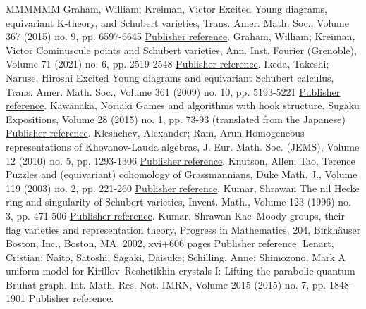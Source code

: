 \begin{thebibliography}{MMMMMM}
 Graham, William; Kreiman, Victor Excited Young diagrams, equivariant K-theory, and Schubert varieties, Trans. Amer. Math. Soc., Volume 367 (2015) no. 9, pp. 6597-6645 \href{https://alco.centre-mersenne.org/articles/10.5802/alco.428/#graham.kreiman:excited}{Publisher reference}.
 Graham, William; Kreiman, Victor Cominuscule points and Schubert varieties, Ann. Inst. Fourier (Grenoble), Volume 71 (2021) no. 6, pp. 2519-2548 \href{https://alco.centre-mersenne.org/articles/10.5802/alco.428/#graham.kreiman:cominuscule_pt}{Publisher reference}.
 Ikeda, Takeshi; Naruse, Hiroshi Excited Young diagrams and equivariant Schubert calculus, Trans. Amer. Math. Soc., Volume 361 (2009) no. 10, pp. 5193-5221 \href{https://alco.centre-mersenne.org/articles/10.5802/alco.428/#ikeda2009excited}{Publisher reference}.
 Kawanaka, Noriaki Games and algorithms with hook structure, Sugaku Expositions, Volume 28 (2015) no. 1, pp. 73-93 (translated from the Japanese) \href{https://alco.centre-mersenne.org/articles/10.5802/alco.428/#Kaw15}{Publisher reference}.
 Kleshchev, Alexander; Ram, Arun Homogeneous representations of Khovanov-Lauda algebras, J. Eur. Math. Soc. (JEMS), Volume 12 (2010) no. 5, pp. 1293-1306 \href{https://alco.centre-mersenne.org/articles/10.5802/alco.428/#kleschchev.ram}{Publisher reference}.
 Knutson, Allen; Tao, Terence Puzzles and (equivariant) cohomology of Grassmannians, Duke Math. J., Volume 119 (2003) no. 2, pp. 221-260 \href{https://alco.centre-mersenne.org/articles/10.5802/alco.428/#knutson.tao:puzzles}{Publisher reference}.
 Kumar, Shrawan The nil Hecke ring and singularity of Schubert varieties, Invent. Math., Volume 123 (1996) no. 3, pp. 471-506 \href{https://alco.centre-mersenne.org/articles/10.5802/alco.428/#kumar1996nil}{Publisher reference}.
 Kumar, Shrawan Kac–Moody groups, their flag varieties and representation theory, Progress in Mathematics, 204, Birkhäuser Boston, Inc., Boston, MA, 2002, xvi+606 pages \href{https://alco.centre-mersenne.org/articles/10.5802/alco.428/#kumar:book}{Publisher reference}.
 Lenart, Cristian; Naito, Satoshi; Sagaki, Daisuke; Schilling, Anne; Shimozono, Mark A uniform model for Kirillov–Reshetikhin crystals I: Lifting the parabolic quantum Bruhat graph, Int. Math. Res. Not. IMRN, Volume 2015 (2015) no. 7, pp. 1848-1901 \href{https://alco.centre-mersenne.org/articles/10.5802/alco.428/#LNSSS}{Publisher reference}.

\end{thebibliography}
